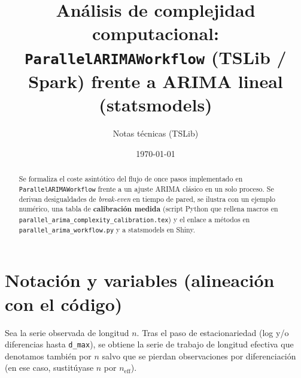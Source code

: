 \documentclass[11pt,a4paper]{article}
\title{Análisis de complejidad computacional:\\
\texttt{ParallelARIMAWorkflow} (TSLib / Spark) frente a ARIMA lineal (statsmodels)}
\author{Notas técnicas (TSLib)}
\date{\today}
\begin{document}
\maketitle

\begin{abstract}
Se formaliza el coste asintótico del flujo de once pasos implementado en
\texttt{ParallelARIMAWorkflow} frente a un ajuste ARIMA clásico en un solo proceso.
Se derivan desigualdades de \emph{break-even} en tiempo de pared, se ilustra con un
ejemplo numérico, una tabla de \textbf{calibración medida} (script Python que
rellena macros en \texttt{parallel\_arima\_complexity\_calibration.tex}) y el
enlace a métodos en \texttt{parallel\_arima\_workflow.py} y a statsmodels en Shiny.
\end{abstract}

\tableofcontents
\newpage

\section{Notación y variables (alineación con el código)}

Sea la serie observada de longitud $n$. Tras el paso de estacionariedad (log y/o
diferencias hasta \texttt{d\_max}), se obtiene la serie de trabajo de longitud
efectiva que denotamos también por $n$ salvo que se pierdan observaciones por
diferenciación (en ese caso, sustitúyase $n$ por $n_{\mathrm{eff}}$).
\end{document}
